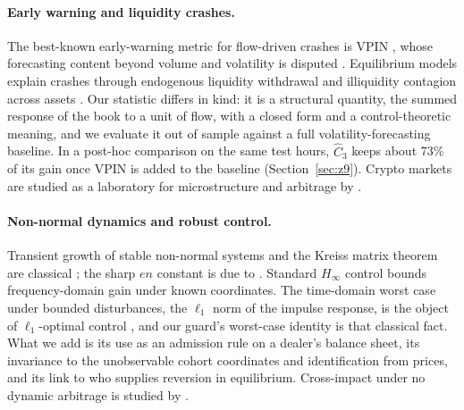 \documentclass[12pt]{article}
\theoremstyle{definition}
\theoremstyle{remark}
\begin{document}
\paragraph{Early warning and liquidity crashes.} The best-known early-warning metric for flow-driven crashes is VPIN \citep{easley2012}, whose forecasting content beyond volume and volatility is disputed \citep{andersen2014}. Equilibrium models explain crashes through endogenous liquidity withdrawal \citep{huang2009} and illiquidity contagion across assets \citep{cespa2014}. Our statistic differs in kind: it is a structural quantity, the summed response of the book to a unit of flow, with a closed form and a control-theoretic meaning, and we evaluate it out of sample against a full volatility-forecasting baseline. In a post-hoc comparison on the same test hours, $\hat C_3$ keeps about 73\% of its gain once VPIN is added to the baseline (Section~\ref{sec:z9}). Crypto markets are studied as a laboratory for microstructure and arbitrage by \citet{makarov2020}.

\paragraph{Non-normal dynamics and robust control.} Transient growth of stable non-normal systems and the Kreiss matrix theorem are classical \citep{trefethen2005,kreiss1962}; the sharp $en$ constant is due to \citet{spijker1991}. Standard $H_\infty$ control bounds frequency-domain gain under known coordinates. The time-domain worst case under bounded disturbances, the $\ell_1$ norm of the impulse response, is the object of $\ell_1$-optimal control \citep{vidyasagar1986,dahleh1987,dahleh1995}, and our guard's worst-case identity is that classical fact. What we add is its use as an admission rule on a dealer's balance sheet, its invariance to the unobservable cohort coordinates and identification from prices, and its link to who supplies reversion in equilibrium. Cross-impact under no dynamic arbitrage is studied by \citet{schneider2019}.
\end{document}
